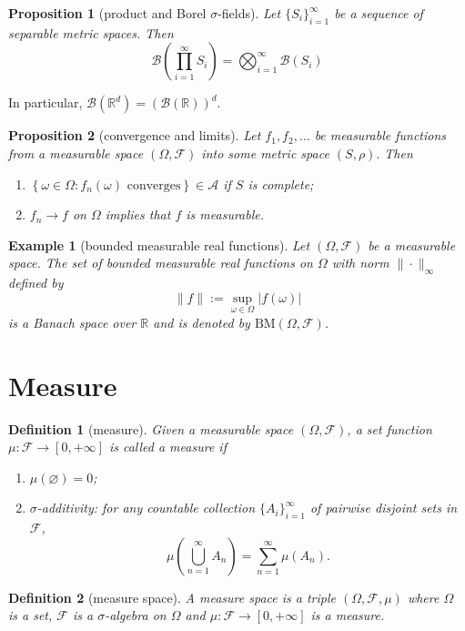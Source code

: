 \documentclass{report}
\newtheorem{definition}{Definition}[section]
\newtheorem{example}{Example}[section]
\newtheorem{proposition}{Proposition}[section]
\theoremstyle{nonumberplain}
\begin{document}
\begin{proposition}[product and Borel $\sigma$-fields]
	Let $\{S_i\}_{i=1}^\infty$ be a sequence of separable metric spaces. Then
	\[
	\mathcal{B}\left(\prod_{i=1}^\infty S_{i} \right)=\bigotimes_{i=1}^\infty\mathcal{B}\left(S_{i}\right)
	\]
\end{proposition}
In particular, $\mathcal{B}\left(\mathbb{R}^{d}\right)=(\mathcal{B}(\mathbb{R}))^{d}$.
\begin{proposition}[convergence and limits]
	Let $f_{1}, f_{2}, \ldots$ be measurable functions from a measurable space $(\Omega, \mathcal{F})$ into some metric space $(S, \rho) .$ Then
	\begin{enumerate}
		\item[(i)] $\left\{\omega\in\Omega:f_{n}(\omega) \text { converges}\right\} \in \mathcal{A}$ if $S$ is complete;
		\item[(ii)] $f_{n} \rightarrow f$ on $\Omega$ implies that $f$ is measurable.
	\end{enumerate}
\end{proposition}
\begin{example}[bounded measurable real functions]
	Let $(\Omega, \mathcal{F})$ be a measurable space. The set of bounded measurable real functions on $\Omega$ with norm $\|\cdot\|_\infty$ defined by
	\[
	\|f\|:=\sup_{\omega\in \Omega}|f(\omega)|
	\]
	is a Banach space over $\mathbb{R}$ and is denoted by $\mathrm{BM}(\Omega, \mathcal{F})$.
	
\end{example}

\section{Measure}
\begin{definition}[measure]
	Given a measurable space $(\Omega, \mathcal{F})$, a set function $\mu:\mathcal{F}\to[0,+\infty]$ is called a \emph{measure} if
	\begin{enumerate}
	\item[(a)]$\mu(\varnothing) = 0$;
	\item[(b)]$\sigma$-additivity: for any countable collection $\{A_{i}\}_{i=1}^{\infty }$ of pairwise disjoint sets in $\mathcal{F}$,
	\[
	\mu\left(\bigcup_{n=1}^\infty A_n\right)=\sum_{n=1}^{\infty}\mu(A_n).
	\]
	\end{enumerate}
\end{definition}

\begin{definition}[measure space]
 A \emph{measure space} is a triple $(\Omega,\mathcal{F},\mu)$ where $\Omega$ is a set, $\mathcal{F}$ is a $\sigma$-algebra on $\Omega$ and $\mu:\mathcal{F}\rightarrow[0,+\infty]$ is a measure.
\end{definition} 
\end{document}
